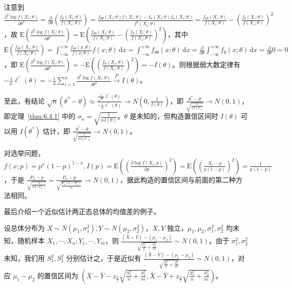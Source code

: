 \documentclass[../main.tex]{subfiles}
\begin{document}
注意到 $\frac{\partial^2\log f(X_i;\theta)}{\partial\theta^2}=\frac\partial{\partial\theta}\left(\frac{f_\theta(X_i;\theta)}{f(X_i;\theta)}\right)=\frac{f_{\theta\theta}(X_i;\theta)f(X_i;\theta)-f_\theta(X_i;\theta)f_\theta(X_i;\theta)}{f^2(X_i;\theta)}=\frac{f_{\theta\theta}(X_i;\theta)}{f(X_i;\theta)}-\left(\frac{f_\theta(X_i;\theta)}{f(X_i;\theta)}\right)^2$，故 $\mathrm E\left(\frac{\partial^2\log f(X_i;\theta)}{\partial\theta^2}\right)=\mathrm E\left(\frac{f_{\theta\theta}(X_i;\theta)}{f(X_i;\theta)}-\left(\frac{f_\theta(X_i;\theta)}{f(X_i;\theta)}\right)^2\right)$，其中 $\mathrm E(\frac{f_{\theta\theta}(X_i;\theta)}{f(X_i;\theta)})=\int_{-\infty}^{+\infty}\frac{f_{\theta\theta}(x;\theta)}{f(x;\theta)}f(x;\theta)\,\mathrm dx=\int_{-\infty}^{+\infty}f_{\theta\theta}(x;\theta)\,\mathrm dx=\frac{\partial}{\partial\theta}\int_{-\infty}^{+\infty}f_\theta(x;\theta)\,\mathrm dx=\frac{\partial}{\partial\theta}0=0$，即 $\mathrm E\left(\frac{\partial^2\log f(X_i;\theta)}{\partial\theta^2}\right)=-\mathrm E\left(\left(\frac{f_\theta(X_i;\theta)}{f(X_i;\theta)}\right)^2\right)=-I(\theta)$。则根据弱大数定律有 $-\frac1n\ell^{\prime\prime}(\theta)=-\frac1n\sum_{i=1}^n\frac{\partial^2\log f(X_i;\theta)}{\partial\theta^2}\overset{P}{\rightarrow}I(\theta)$。

至此，有结论 $\sqrt n(\theta^*-\theta)\approx\frac{\frac1{\sqrt n}\ell^\prime(\theta)}{-\frac1n\ell^{\prime\prime}(\theta)}\rightarrow N(0,\frac1{I(\theta)})$，即 $\frac{\theta^*-\theta}{\sqrt{\frac1{nI(\theta)}}}\rightarrow N(0,1)$，即定理~\ref{thm:6.4.1} 中的 $\sigma_n=\sqrt{\frac1{nI(\theta)}}$。$\theta$ 是未知的，但构造置信区间时 $I(\theta)$ 可以用 $I(\theta^*)$ 估计，即 $\frac{\theta^*-\theta}{\sqrt{\frac1{nI(\theta^*)}}}\rightarrow N(0,1)$。

对选举问题，$f(x;p)=p^x(1-p)^{1-x},I(p)=\mathrm E\left(\left(\frac{\partial\log f(X_i;p)}{\partial p}\right)^2\right)=\mathrm E\left(\left(\frac{X_i-p}{p(1-p)}\right)^2\right)=\frac1{p(1-p)}$，于是 $\frac{P_n-p}{\sqrt{\frac1{nI(P_n)}}}=\frac{P_n-p}{\sqrt{\frac{P_n(1-P_n)}n}}\rightarrow N(0,1)$，据此构造的置信区间与前面的第二种方法相同。

最后介绍一个近似估计两正态总体的均值差的例子。

\begin{example}
    设总体分布为 $X\sim N(\mu_1,\sigma_1^2),Y\sim N(\mu_2,\sigma_2^2)$，$X,Y$ 独立，$\mu_1,\mu_2,\sigma_1^2,\sigma_2^2$ 均未知，随机样本 $X_1,\cdots,X_n;Y_1,\cdots,Y_m$，则 $\frac{(\bar X-\bar Y)-(\mu_1-\mu_2)}{\sqrt{\frac{\sigma_1^2}n+\frac{\sigma_2^2}m}}\sim N(0,1)$。由于 $\sigma_1^2,\sigma_2^2$ 未知，我们用 $S_1^2,S_2^2$ 分别估计之，于是近似有 $\frac{(\bar X-\bar Y)-(\mu_1-\mu_2)}{\sqrt{\frac{S_1^2}n+\frac{S_2^2}m}}\sim N(0,1)$，对应 $\mu_1-\mu_2$ 的置信区间为 $(\bar X-\bar Y-z_{\frac\alpha2}\sqrt{\frac{S_1^2}n+\frac{S_2^2}m},\bar X-\bar Y+z_{\frac\alpha2}\sqrt{\frac{S_1^2}n+\frac{S_2^2}m})$。
\end{example}
\end{document}
